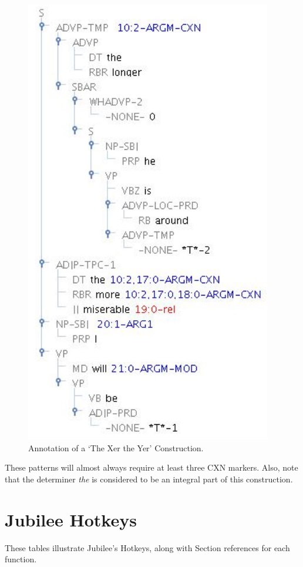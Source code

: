 \documentclass[11pt]{report}
\begin{document}
\begin{figure}[htbp]
\centering
\includegraphics[scale=0.7]{img/XerYer.jpg}
\caption{Annotation of a `The Xer the Yer' Construction.}
\label{fig: XerYerConstruction}
\end{figure}

These patterns will almost always require at least three CXN markers. Also, note that the determiner \textit{the} is considered to be an integral part of this construction. 

\pagebreak
\appendix
\chapter{Jubilee Hotkeys}

These tables illustrate Jubilee's Hotkeys, along with Section references for each function. 
\end{document}
